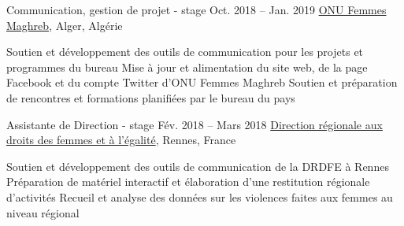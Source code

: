 \begin{joblist}

\item[Communication, gestion de projet - stage]{Oct. 2018 -- Jan. 2019 }     
	{
	\href{http://maghreb.unwomen.org/fr}{ONU Femmes Maghreb}, Alger, Algérie
	}     
	{
			 
		\vspace{-0.5cm}
		\begin{itemize}
			  \iftbftiny \setlength\itemsep{-3pt} \fi
			  \cvitem[\checkmark] Soutien et développement des outils de communication pour les projets et programmes du bureau      
 			  \cvitem[\checkmark] Mise à jour et alimentation du site web, de la page Facebook et du compte Twitter d’ONU Femmes Maghreb                                                            
			  \cvitem[\checkmark] Soutien et préparation de rencontres et formations planifiées par le bureau du pays
		\end{itemize}      

	}


\item[Assistante de Direction - stage]{Fév. 2018 -- Mars 2018 }     
	{
	\href{https://www.egalite-femmes-hommes.gouv.fr/le-secretariat-d-etat/organisation-du-ministere/services-territoriaux/annuaire-des-equipes-regionales-et-departementales/}{Direction régionale aux droits des femmes et à l'égalité}, Rennes, France
	}     
	{
			 
		\iftbftiny \vspace{-0.5cm} \fi
		\begin{itemize}
			  \iftbftiny \setlength\itemsep{-3pt} \fi
			  \cvitem[\checkmark] Soutien et développement des outils de communication de la DRDFE à Rennes      
			  \cvitem[\checkmark] Préparation de matériel interactif et élaboration d'une restitution régionale d'activités
			  \cvitem[\checkmark] Recueil et analyse des données sur les violences faites aux femmes au niveau régional
		\end{itemize}      

}
\end{joblist}

